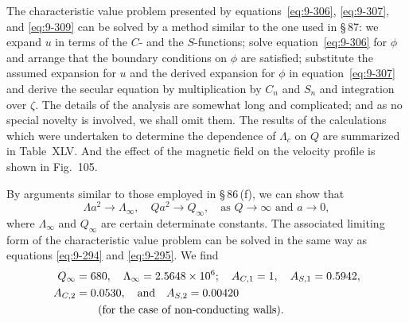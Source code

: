 The characteristic value problem presented by equations~\eqref{eq:9-306}, \eqref{eq:9-307}, and \eqref{eq:9-309} can be solved by a method similar to the one used in \S\,87: we expand $u$ in terms of the $C$- and the $S$-functions; solve equation~\eqref{eq:9-306} for $\phi$ and arrange that the boundary conditions on $\phi$ are satisfied; substitute the assumed expansion for $u$ and the derived expansion for $\phi$ in equation~\eqref{eq:9-307} and derive the secular equation by multiplication by $C_n$ and $S_n$ and integration over $\zeta$. The details of the analysis are somewhat long and complicated; and as no special novelty is involved, we shall omit them. The results of the calculations which were undertaken to determine the dependence of $\Lambda_c$ on $Q$ are summarized in Table~XLV. And the effect of the magnetic field on the velocity profile is shown in Fig.~105.


By arguments similar to those employed in \S\,86\,(f), we can show that
\begin{equation}
\Lambda a^2 \to \Lambda_\infty, \quad Qa^2 \to Q_\infty, \quad \text{as } Q \to \infty \text{ and } a \to 0, \label{eq:9-310}
\end{equation}
where $\Lambda_\infty$ and $Q_\infty$ are certain determinate constants. The associated limiting form of the characteristic value problem can be solved in the same way as equations \eqref{eq:9-294} and \eqref{eq:9-295}. We find
\begin{align}
Q_\infty &= 680, \quad \Lambda_\infty = 2.5648 \times 10^6; \quad A_{C,1} = 1, \quad A_{S,1} = 0.5942, \notag \\
A_{C,2} &= 0.0530, \quad \text{and} \quad A_{S,2} = 0.00420 \notag \\
&\qquad \text{(for the case of non-conducting walls).} \label{eq:9-311}
\end{align}

